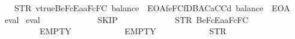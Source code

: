 \begin{isabellebody}
\ \ \ \ \ {\isacharequal}{\kern0pt}\ STR\ {\isacharprime}{\kern0pt}{\isacharprime}{\kern0pt}v{}{\isacharequal}{\kern0pt}{\isacharequal}{\kern0pt}true{\isasymnewline}{}{}{}Be{}{}{}{}FcEa{}{}aF{}{}{}{}{}{}{}{}{}c{}{}F{}{}{}{}{}{}C{}{}{}{\isacharcolon}{\kern0pt}\ balance{\isacharequal}{\kern0pt}{\isacharequal}{\kern0pt}{}{}{}\ {\isacharminus}{\kern0pt}\ EOA{\isasymnewline}{}{}{}f{}e{}F{}{}{}{}{}C{}{}f{}DB{}AC{}{}{}{}{}a{}CC{}{}{}{}{}d{}{}{\isacharcolon}{\kern0pt}\ balance{\isacharequal}{\kern0pt}{\isacharequal}{\kern0pt}{}{}{}\ {\isacharminus}{\kern0pt}\ EOA{\isacharprime}{\kern0pt}{\isacharprime}{\kern0pt}{\isachardoublequoteclose}\isanewline
%
\isadelimproof
\ \ %
\endisadelimproof
%
\isatagproof
{}\isamarkupfalse%
\ eval%
\endisatagproof
{\isafoldproof}%
%
\isadelimproof
\isanewline
%
\endisadelimproof
\isanewline
{}\isamarkupfalse%
\ {\isachardoublequoteopen}eval{}\ {}{}{}{}\isanewline
\ \ \ \ \ \ \ \ \ \ \ \ SKIP\ \isanewline
\ \ \ \ \ \ \ \ \ \ \ \ {\isacharparenleft}{\kern0pt}STR\ {\isacharprime}{\kern0pt}{\isacharprime}{\kern0pt}{}{}{}Be{}{}{}{}FcEa{}{}aF{}{}{}{}{}{}{}{}{}c{}{}F{}{}{}{}{}{}C{}{}{}{\isacharprime}{\kern0pt}{\isacharprime}{\kern0pt}{\isacharparenright}{\kern0pt}\isanewline
\ \ \ \ \ \ \ \ \ \ \ \ EMPTY\isanewline
\ \ \ \ \ \ \ \ \ \ \ \ EMPTY\isanewline
\ \ \ \ \ \ \ \ \ \ \ \ {\isacharparenleft}{\kern0pt}STR\ {\isacharprime}{\kern0pt}{\isacharprime}{\kern0pt}{}{\isacharprime}{\kern0pt}{\isacharprime}{\kern0pt}{\isacharparenright}{\kern0pt}\isanewline

\end{isabellebody}
